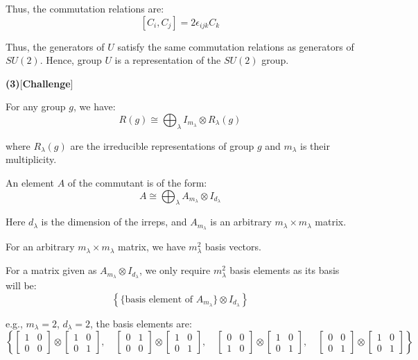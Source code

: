 \documentclass{article}
\begin{document}
Thus, the commutation relations are:
\[
[C_i , C_j] = 2 \epsilon_{ijk} C_k
\]

Thus, the generators of \(U\) satisfy the same commutation relations as generators of \(SU(2)\).  
Hence, group \(U\) is a representation of the \(SU(2)\) group.


\textbf{(3)}[\textbf{Challenge}]

For any group \(g\), we have:
\[
R(g) \cong \bigoplus_{\lambda} I_{m_\lambda} \otimes R_\lambda(g)
\]

where \(R_\lambda(g)\) are the irreducible representations of group \(g\) and \(m_\lambda\) is their multiplicity.

An element \(A\) of the commutant is of the form:
\[
A \cong  \bigoplus_\lambda A_{m_\lambda} \otimes I_{d_\lambda}
\]

Here \(d_\lambda\) is the dimension of the irreps,  
and \(A_{m_\lambda}\) is an arbitrary \(m_\lambda \times m_\lambda\) matrix.


For an arbitrary \(m_\lambda \times m_\lambda\) matrix, we have \(m_\lambda^2\) basis vectors.


For a matrix given as \(A_{m_\lambda} \otimes I_{d_\lambda}\), we only require \(m_\lambda^2\) basis elements as its basis will be:
\[
\left\{ \{\text{basis element of } A_{m_\lambda}\} \otimes I_{d_\lambda} \right\}
\]

e.g., \(m_\lambda = 2\), \(d_\lambda = 2\), the basis elements are:
\[
\left\{
\begin{bmatrix}
1 & 0 \\
0 & 0
\end{bmatrix} \otimes 
\begin{bmatrix}
1 & 0 \\
0 & 1
\end{bmatrix}, \quad
\begin{bmatrix}
0 & 1 \\
0 & 0
\end{bmatrix} \otimes 
\begin{bmatrix}
1 & 0 \\
0 & 1
\end{bmatrix}, \quad
\begin{bmatrix}
0 & 0 \\
1 & 0
\end{bmatrix} \otimes 
\begin{bmatrix}
1 & 0 \\
0 & 1
\end{bmatrix}, \quad
\begin{bmatrix}
0 & 0 \\
0 & 1
\end{bmatrix} \otimes 
\begin{bmatrix}
1 & 0 \\
0 & 1
\end{bmatrix}
\right\}
\]
\end{document}
